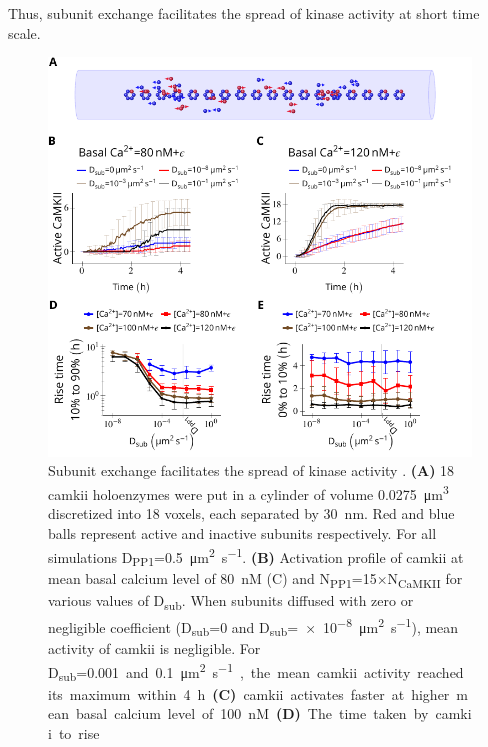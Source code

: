 \documentclass[9pt,lineno,doublespacing]{elife}
\newcommand\SUB[2]{#1\textsubscript{#2}}
\begin{document}
Thus, subunit exchange facilitates the spread of kinase activity at short time
scale.

\begin{figure}
    \includegraphics[width=0.95\linewidth]{./PaperFigures/elifeFigure4/figure_camkii_activation_130mm.pdf}
    \caption{Subunit exchange facilitates the spread of kinase activity
        \citep{stratton_activation-triggered_2014}. \textbf{(A)} 18 \gls{camkii} holoenzymes were put in
        a cylinder of volume \SI{0.0275}{\cubic\micro\meter} discretized into 18
        voxels, each separated by \SI{30}{\nano\meter}. Red and blue balls
        represent active and inactive subunits respectively.  For all
        simulations \SUB{D}{PP1}=\SI{0.5}{\micro\meter\squared\per\second}.
        \textbf{(B)} Activation profile of \gls{camkii} at mean basal calcium
        level of \SI{80}{\nano M} (C) and
        \SUB{N}{PP1}=15$\times$\SUB{N}{CaMKII} for various values of
        \SUB{D}{sub}. When subunits diffused with zero or negligible coefficient
        (\SUB{D}{sub}=0 and
        \SUB{D}{sub}=\SI{e-8}{\micro\meter\squared\per\second}), mean activity
        of \gls{camkii} is negligible. For \SUB{D}{sub}=\SI{0.001} and
        \SI{0.1}{\micro\meter\squared\per\second}, the mean \gls{camkii}
        activity reached its maximum within \SI{4}{\hour}.  \textbf{(C)}
        \gls{camkii} activates faster at higher mean basal calcium level of
        \SI{100}{\nano M}. \textbf{(D)} The time taken by \gls{camkii} to rise
}
\end{figure}
\end{document}
